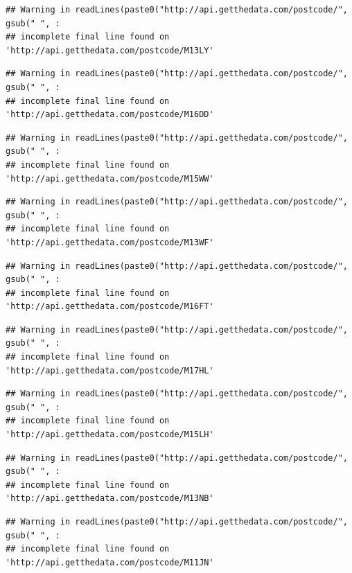 \documentclass[]{book}
\begin{document}
\begin{verbatim}
## Warning in readLines(paste0("http://api.getthedata.com/postcode/", gsub(" ", :
## incomplete final line found on 'http://api.getthedata.com/postcode/M13LY'
\end{verbatim}

\begin{verbatim}
## Warning in readLines(paste0("http://api.getthedata.com/postcode/", gsub(" ", :
## incomplete final line found on 'http://api.getthedata.com/postcode/M16DD'
\end{verbatim}

\begin{verbatim}
## Warning in readLines(paste0("http://api.getthedata.com/postcode/", gsub(" ", :
## incomplete final line found on 'http://api.getthedata.com/postcode/M15WW'
\end{verbatim}

\begin{verbatim}
## Warning in readLines(paste0("http://api.getthedata.com/postcode/", gsub(" ", :
## incomplete final line found on 'http://api.getthedata.com/postcode/M13WF'
\end{verbatim}

\begin{verbatim}
## Warning in readLines(paste0("http://api.getthedata.com/postcode/", gsub(" ", :
## incomplete final line found on 'http://api.getthedata.com/postcode/M16FT'
\end{verbatim}

\begin{verbatim}
## Warning in readLines(paste0("http://api.getthedata.com/postcode/", gsub(" ", :
## incomplete final line found on 'http://api.getthedata.com/postcode/M17HL'
\end{verbatim}

\begin{verbatim}
## Warning in readLines(paste0("http://api.getthedata.com/postcode/", gsub(" ", :
## incomplete final line found on 'http://api.getthedata.com/postcode/M15LH'
\end{verbatim}

\begin{verbatim}
## Warning in readLines(paste0("http://api.getthedata.com/postcode/", gsub(" ", :
## incomplete final line found on 'http://api.getthedata.com/postcode/M13NB'
\end{verbatim}

\begin{verbatim}
## Warning in readLines(paste0("http://api.getthedata.com/postcode/", gsub(" ", :
## incomplete final line found on 'http://api.getthedata.com/postcode/M11JN'
\end{verbatim}
\end{document}
